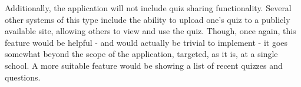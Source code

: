 Additionally, the application will not include quiz sharing functionality. Several other systems of this type include the ability to upload one's quiz to a publicly available site, allowing others to view and use the quiz. Though, once again, this feature would be helpful - and would actually be trivial to implement - it goes somewhat beyond the scope of the application, targeted, as it is, at a single school. A more suitable feature would be showing a list of recent quizzes and questions.
